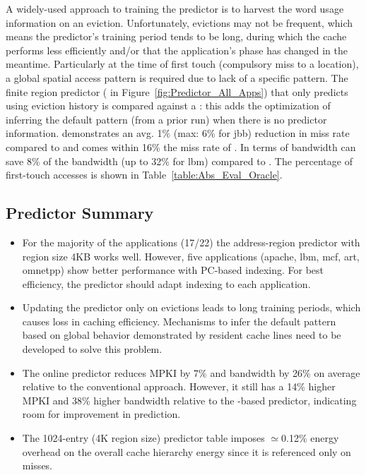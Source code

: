 {{A widely-used approach to training the predictor is to harvest the word usage information on an eviction. Unfortunately, evictions may not be frequent, which means the predictor's training period tends to be long, during which the cache performs less efficiently and/or that the application's phase has changed in the meantime. Particularly at the time of first touch (compulsory miss to a location), a global spatial access pattern is required due to lack of a specific pattern. The finite region predictor ( in Figure~\ref{fig:Predictor_All_Apps}) that only predicts using eviction history is compared against a : this adds the optimization of inferring the default pattern (from a prior run) when there is no predictor information.  demonstrates an avg. 1\% (max: 6\% for jbb) reduction in miss rate compared to  and comes within 16\% the miss rate of . In terms of bandwidth  can save 8\% of the bandwidth (up to 32\% for lbm) compared to . The percentage of first-touch accesses is shown in Table~\ref{table:Abs_Eval_Oracle}.  




\subsection{Predictor Summary}
\begin{itemize}
  \item For the majority of the applications (17/22) the address-region predictor with region size 4KB works well. However, five applications (apache, lbm, mcf, art, omnetpp) show better performance with PC-based indexing. For best efficiency, the predictor should adapt indexing to each application. 
  \item Updating the predictor only on evictions leads to long training periods, which causes loss in caching efficiency. Mechanisms to infer the default pattern based on global behavior demonstrated by resident cache lines need to be developed to solve this problem.
  \item The online predictor reduces MPKI by 7\% and bandwidth by 26\% on average relative to the conventional approach. However, it still has a 14\% higher MPKI and 38\% higher bandwidth relative to the -based predictor, indicating room for improvement in prediction. 
  \item The 1024-entry (4K region size) predictor table imposes $\simeq$0.12\% energy overhead on the overall cache hierarchy energy since it is referenced only on misses.
\end{itemize}

}}
